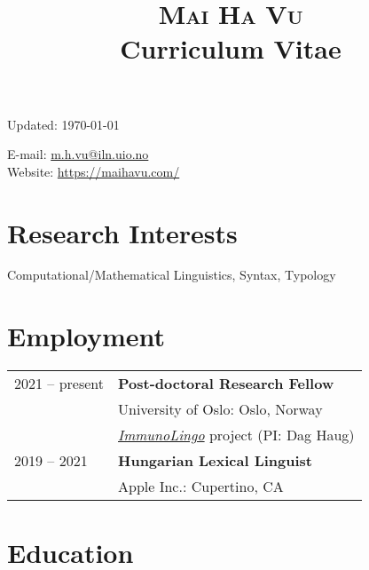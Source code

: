 \documentclass[11pt]{article} %
\title{\textsc{Mai Ha Vu} \\ {\large Curriculum Vitae}}
\date{}
\begin{document}
\maketitle 

\vskip -50pt
\begin{minipage}[ht]{0.65\textwidth}
Updated: \today \\
\end{minipage}
\begin{minipage}[ht]{0.60\textwidth}
\begin{flushleft}

E-mail: \href{mailto:m.h.vu@iln.uio.no}{m.h.vu@iln.uio.no} \\
Website: \href{https://maihavu.com/}{https://maihavu.com/}
\end{flushleft}
\end{minipage}

\section*{Research Interests}
Computational/Mathematical Linguistics, Syntax, Typology


\section*{Employment}

\begin{tabular}{p{1in} l}
	2021 -- present & \textbf{Post-doctoral Research Fellow} \\
	& University of Oslo: Oslo, Norway \\
	& \href{https://www.uio.no/english/research/strategic-research-areas/life-science/research/convergence-environments/immunolingo/}{\textit{ImmunoLingo}} project (PI: Dag Haug)\\
	2019 -- 2021 & \textbf{Hungarian Lexical Linguist} \\
	& Apple Inc.: Cupertino, CA \\[2pt]
\end{tabular}

\section*{Education}
\end{document}
